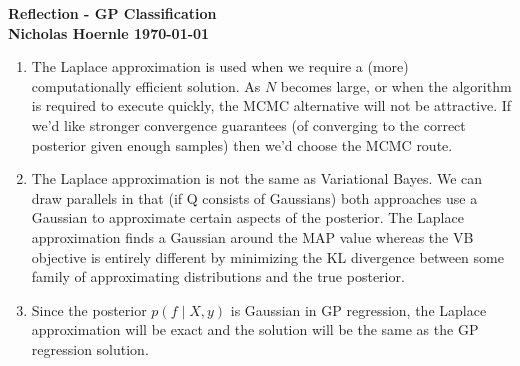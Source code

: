 \documentclass[twoside]{article}
\begin{document}
\textbf{Reflection - GP Classification}\\
\textbf{Nicholas Hoernle \hfill \today}

\begin{enumerate}
\item The Laplace approximation is used when we require a (more) computationally efficient solution. As $N$ becomes large, or when the algorithm is required to execute quickly, the MCMC alternative will not be attractive. If we'd like stronger convergence guarantees (of converging to the correct posterior given enough samples) then we'd choose the MCMC route.
\item The Laplace approximation is not the same as Variational Bayes. We can draw parallels in that (if Q consists of Gaussians) both approaches use a Gaussian to approximate certain aspects of the posterior. The Laplace approximation finds a Gaussian around the MAP value whereas the VB objective is entirely different by minimizing the KL divergence between some family of approximating distributions and the true posterior.
\item Since the posterior $p(f \mid X, y)$ is Gaussian in GP regression, the Laplace approximation will be exact and the solution will be the same as the GP regression solution.
\end{enumerate}
\end{document}
